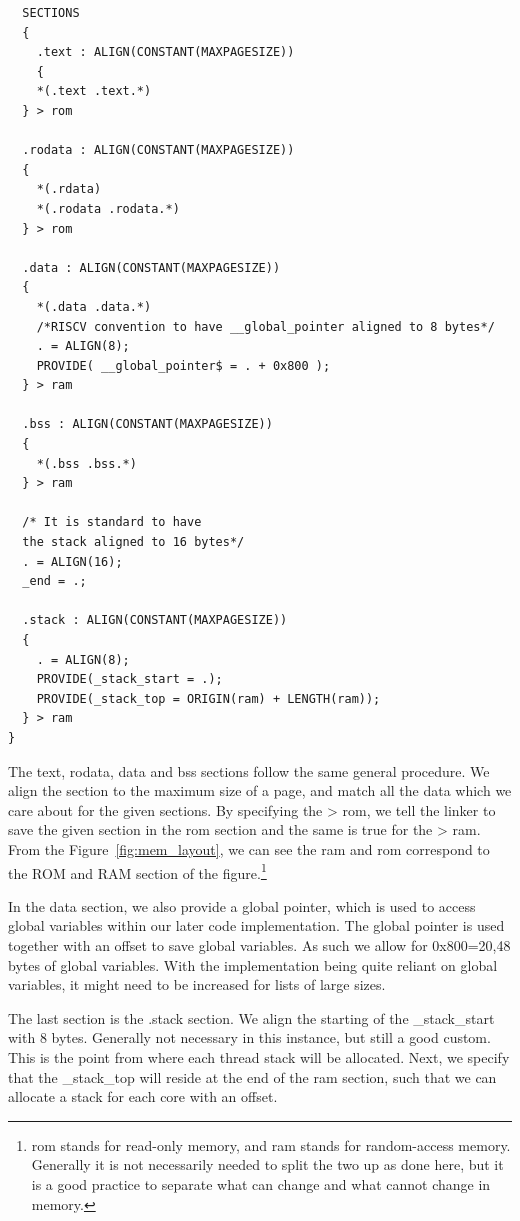 \begin{lstlisting}
  SECTIONS
  {
    .text : ALIGN(CONSTANT(MAXPAGESIZE))
    {
    *(.text .text.*)
  } > rom

  .rodata : ALIGN(CONSTANT(MAXPAGESIZE))
  {
    *(.rdata)
    *(.rodata .rodata.*)
  } > rom

  .data : ALIGN(CONSTANT(MAXPAGESIZE))
  {
    *(.data .data.*)
    /*RISCV convention to have __global_pointer aligned to 8 bytes*/
    . = ALIGN(8);
    PROVIDE( __global_pointer$ = . + 0x800 );
  } > ram

  .bss : ALIGN(CONSTANT(MAXPAGESIZE))
  {
    *(.bss .bss.*)
  } > ram

  /* It is standard to have
  the stack aligned to 16 bytes*/
  . = ALIGN(16);
  _end = .;

  .stack : ALIGN(CONSTANT(MAXPAGESIZE))
  {
    . = ALIGN(8);
    PROVIDE(_stack_start = .);
    PROVIDE(_stack_top = ORIGIN(ram) + LENGTH(ram));
  } > ram
}
\end{lstlisting}
The text, rodata, data and bss sections follow the same general procedure. We
align the section to the maximum size of a page, and match all the data which we
care about for the given sections. By specifying the > rom, we tell the linker
to save the given section in the rom section and the same is true for the > ram.
From the Figure~\ref{fig:mem_layout}, we can see the ram and rom correspond to
the ROM and RAM section of the figure.\footnote{rom stands for read-only memory,
and ram stands for random-access memory. Generally it is not necessarily needed
to split the two up as done here, but it is a good practice to separate what can
change and what cannot change in memory.}

In the data section, we also provide a global pointer, which is used to access
global variables within our later code implementation. The global pointer is
used together with an offset to save global variables. As such we allow for
0x800=20,48 bytes of global variables. With the implementation being quite
reliant on global variables, it might need to be increased for lists of large
sizes.

The last section is the .stack section. We align the starting of the
\_stack\_start with 8 bytes. Generally not necessary in this instance, but still
a good custom. This is the point from where each thread stack will be allocated.
Next, we specify that the \_stack\_top will reside at the end of the ram
section, such that we can allocate a stack for each core with an offset.

